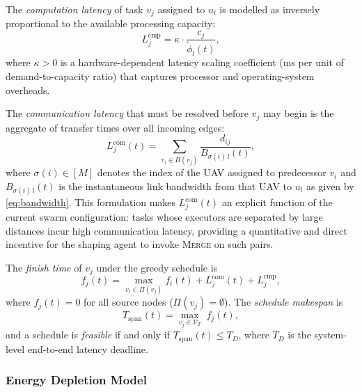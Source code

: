 The \emph{computation latency} of task $v_j$ assigned to $u_l$ is
modelled as inversely proportional to the available processing
capacity:
\begin{equation}
  L_j^{\mathrm{cmp}} = \kappa \cdot \frac{c_j}{\tilde{\phi}_l(t)},
  \label{eq:latency_cmp}
\end{equation}
where $\kappa > 0$ is a hardware-dependent latency scaling coefficient
(ms per unit of demand-to-capacity ratio) that captures processor and
operating-system overheads.

The \emph{communication latency} that must be resolved before $v_j$
may begin is the aggregate of transfer times over all incoming edges:
\begin{equation}
  L_j^{\mathrm{com}}(t)
  = \sum_{v_i \in \Pi(v_j)}
    \frac{d_{ij}}{B_{\sigma(i)\,l}(t)},
  \label{eq:latency_com}
\end{equation}
where $\sigma(i) \in [M]$ denotes the index of the UAV assigned to
predecessor $v_i$ and $B_{\sigma(i)\,l}(t)$ is the instantaneous
link bandwidth from that UAV to $u_l$ as given by
\eqref{eq:bandwidth}.
This formulation makes $L_j^{\mathrm{com}}(t)$ an explicit function
of the current swarm configuration: tasks whose executors are
separated by large distances incur high communication latency,
providing a quantitative and direct incentive for the shaping agent
to invoke \textsc{Merge} on such pairs.

The \emph{finish time} of $v_j$ under the greedy schedule is
\begin{equation}
  f_j(t) = \max_{v_i \in \Pi(v_j)} f_i(t)
            + L_j^{\mathrm{com}}(t)
            + L_j^{\mathrm{cmp}},
  \label{eq:finish_time}
\end{equation}
where $f_j(t) = 0$ for all source nodes ($\Pi(v_j) = \emptyset$).
The \emph{schedule makespan} is
\begin{equation}
  T_{\mathrm{span}}(t) = \max_{v_j \in \mathcal{V}_T}\; f_j(t),
  \label{eq:makespan}
\end{equation}
and a schedule is \emph{feasible} if and only if
$T_{\mathrm{span}}(t) \leq T_D$, where $T_D$ is the system-level
end-to-end latency deadline.

\subsubsection*{Energy Depletion Model}

